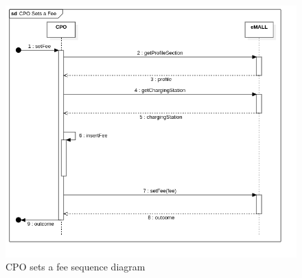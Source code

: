 \begin{center}
    \begin{figure} [H]
        \begin{center}
            \includegraphics[width=0.9\linewidth]{Images/SequenceDiagrams/cpo_sets_a_fee}
            \caption{CPO sets a fee sequence diagram}
            \label{fig: cpo_sets_fee_seq_diag}
        \end{center}
    \end{figure}
\end{center}

